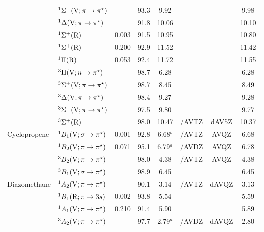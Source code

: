 \begin{tabular}{llcccccc}
                        &$^1\Sigma^- (\mathrm{V};\pi \rightarrow \pi^\star)$				&		&93.3 & 9.92		&			&			&9.98 	\\
                        &$^1\Delta (\mathrm{V};\pi \rightarrow \pi^\star)$ 				&		&91.8 &10.06		&			&			&10.10 	\\
                        &$^1\Sigma^+ (\mathrm{R})$ 								& 0.003	&91.5 &10.95		&			&			&10.80 	\\
                        &$^1\Sigma^+ (\mathrm{R})$ 								& 0.200	&92.9 &11.52		&			&			&11.42 	\\
                        &$^1\Pi (\mathrm{R})$										& 0.053	&92.4 &11.72		&			&			&11.55 	\\
                        &$^3\Pi (\mathrm{V};n \rightarrow \pi^\star)$ 					&		&98.7 & 6.28		&			&			&6.28 	\\
                        &$^3\Sigma^+ (\mathrm{V};\pi \rightarrow \pi^\star)$			&		&98.7 & 8.45		&			&			&8.49 	\\
                        &$^3\Delta (\mathrm{V};\pi \rightarrow \pi^\star)$ 				&		&98.4 & 9.27		&			&			&9.28 	\\
                        &$^3\Sigma^- (\mathrm{V};\pi \rightarrow \pi^\star)$				&		&97.5 & 9.80		&			&			&9.77	\\
                        &$^3\Sigma^+ (\mathrm{R})$ 								&		&98.0 & 10.47		&  {\exCI}/AVTZ &dAV5Z		&10.37 	\\
      Cyclopropene	&$^1B_1 (\mathrm{V};\sigma \rightarrow \pi^\star)$				& 0.001	&92.8 &6.68$^b$	& {\CCSDT}/AVTZ&AVQZ		& 6.68 	\\
                        &$^1B_2 (\mathrm{V};\pi \rightarrow \pi^\star)$				& 0.071	&95.1 &6.79$^a$	& {\exCI}/AVDZ	    &AVQZ		& 6.78 	\\
                        &$^3B_2 (\mathrm{V};\pi \rightarrow \pi^\star)$				&		&98.0 &4.38		& {\exCI}/AVTZ     &AVQZ 	& 4.38	 \\
                        &$^3B_1 (\mathrm{V};\sigma \rightarrow \pi^\star)$				& 		&98.9 &6.45		& 			    &			& 6.45 	\\
      Diazomethane	&$^1A_2 (\mathrm{V};\pi \rightarrow \pi^\star)$ 				&		&90.1 &3.14		&{\exCI}/AVTZ & dAVQZ		&3.13 	\\
                        &$^1B_1 (\mathrm{R};\pi \rightarrow 3s)$ 						& 0.002	&93.8 &5.54		&			&			&5.59 	\\
                        &$^1A_1 (\mathrm{V};\pi \rightarrow \pi^\star)$				& 0.210	&91.4 &5.90		&			&			& 5.89	 \\
                        &$^3A_2 (\mathrm{V};\pi \rightarrow \pi^\star)$ 				&		&97.7 &2.79$^a$	& {\exCI}/AVDZ & dAVQZ		&2.80	\\

\end{tabular}
